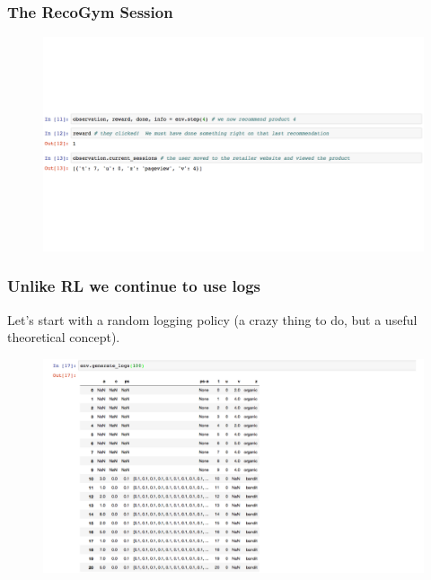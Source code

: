  \begin{frame}
  \frametitle{The RecoGym Session}
 
 
   \begin{figure}[h!]
     \includegraphics[scale=0.3]{images/reco_gym_sess3.png}
       \centering
       \label{motex1}
   \end{figure}
\end{frame}



   \begin{frame}
    \frametitle{Unlike RL we continue to use logs}
   
    Let's start with a random logging policy (a crazy thing to do, but a useful theoretical concept).
    
     \begin{figure}[h!]
       \includegraphics[scale=0.3]{images/recogymlog.png}
         \centering
         \label{motex1}
     \end{figure}
  \end{frame}


